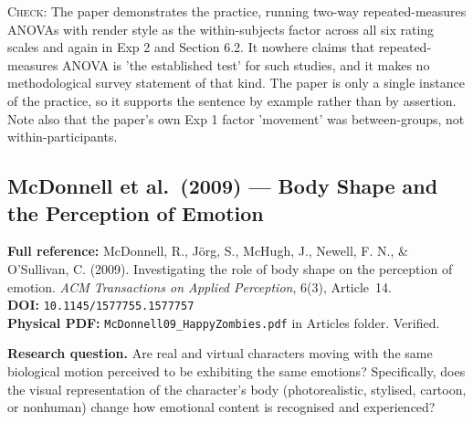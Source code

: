 \documentclass[11pt, a4paper]{article}
\begin{document}
\begin{itemize}[leftmargin=1.2em,itemsep=4pt]
\textsc{Check:} The paper demonstrates the practice, running two-way repeated-measures ANOVAs with render style as the within-subjects factor across all six rating scales and again in Exp 2 and Section 6.2. It nowhere claims that repeated-measures ANOVA is 'the established test' for such studies, and it makes no methodological survey statement of that kind. The paper is only a single instance of the practice, so it supports the sentence by example rather than by assertion. Note also that the paper's own Exp 1 factor 'movement' was between-groups, not within-participants.
\end{itemize}

\vspace{8pt}
\subsection{McDonnell et al.\ (2009) --- Body Shape and the Perception of Emotion}

\begin{refbox}
\textbf{Full reference:} McDonnell, R., J\"{o}rg, S., McHugh, J., Newell, F. N., \& O'Sullivan, C. (2009). Investigating the role of body shape on the perception of emotion. \textit{ACM Transactions on Applied Perception}, 6(3), Article~14.\\[4pt]
\textbf{DOI:} \texttt{10.1145/1577755.1577757}\\[4pt]
\textbf{Physical PDF:} \texttt{McDonnell09\_HappyZombies.pdf} in Articles folder. Verified.
\end{refbox}

\textbf{Research question.} Are real and virtual characters moving with the same biological motion perceived to be exhibiting the same emotions? Specifically, does the visual representation of the character's body (photorealistic, stylised, cartoon, or nonhuman) change how emotional content is recognised and experienced?
\end{document}
